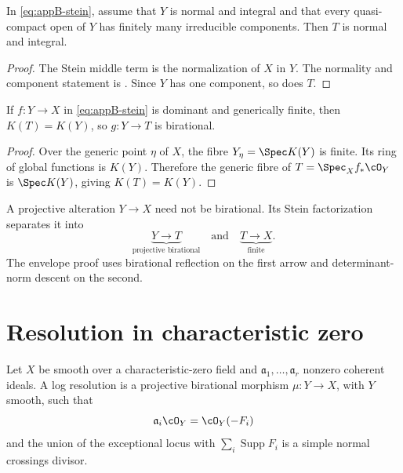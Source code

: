 \begin{proposition}\label{prop:appB-stein-normal}
In \eqref{eq:appB-stein}, assume that \(Y\) is normal and integral and that
every quasi-compact open of \(Y\) has finitely many irreducible components.
Then \(T\) is normal and integral.
\end{proposition}

\begin{proof}
The Stein middle term is the normalization of \(X\) in \(Y\).
The normality and component statement is
\cite[\href{https://stacks.math.columbia.edu/tag/035L}{Tag 035L}]
{stacks-project}.  Since \(Y\) has one component, so does \(T\).
\end{proof}

\begin{lemma}\label{lem:appB-stein-birational}
If \(f:Y\to X\) in \eqref{eq:appB-stein} is dominant and generically
finite, then \(K(T)=K(Y)\), so \(g:Y\to T\) is birational.
\end{lemma}

\begin{proof}
Over the generic point \(\eta\) of \(X\), the fibre
\(Y_\eta=\Spec K(Y)\) is finite.  Its ring of global functions is
\(K(Y)\).  Therefore the generic fibre of
\(T=\Spec_Xf_*\cO_Y\) is \(\Spec K(Y)\), giving \(K(T)=K(Y)\).
\end{proof}

\begin{example}
\label{ex:appB-stein-alteration}
A projective alteration \(Y\to X\) need not be birational.  Its Stein factorization
separates it into
\[
 \underbrace{Y\to T}_{\text{projective birational}}
 \quad\text{and}\quad
 \underbrace{T\to X}_{\text{finite}}.
\]
The envelope proof uses birational reflection on the first arrow and
determinant-norm descent on the second.
\end{example}

\section{Resolution in characteristic zero}
\label{sec:appB-resolution}

\begin{definition}
\label{def:appB-log-resolution}
Let \(X\) be smooth over a characteristic-zero field and
\(\mathfrak a_1,\ldots,\mathfrak a_r\) nonzero coherent ideals.  A log
resolution is a projective birational morphism \(\mu:Y\to X\), with \(Y\)
smooth, such that
\[
 \mathfrak a_i\cO_Y=\cO_Y(-F_i)
\]
and the union of the exceptional locus with
\(\sum_i\operatorname{Supp}F_i\) is a simple normal crossings divisor.
\end{definition}

